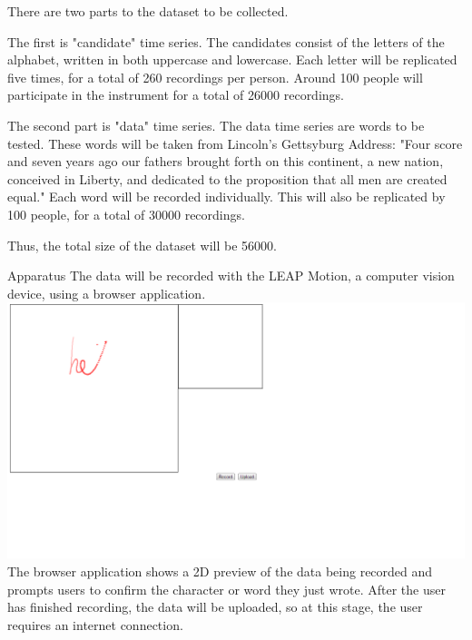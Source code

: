 There are two parts to the dataset to be collected.

The first is "candidate" time series. The candidates consist of the letters of the alphabet, written in both uppercase and lowercase. Each letter will be replicated five times, for a total of 260 recordings per person. Around 100 people will participate in the instrument for a total of 26000 recordings.

The second part is "data" time series. The data time series are words to be tested. These words will be taken from Lincoln's Gettsyburg Address: "Four score and seven years ago our fathers brought forth on this continent, a new nation, conceived in Liberty, and dedicated to the proposition that all men are created equal." Each word will be recorded individually. This will also be replicated by 100 people, for a total of 30000 recordings.

Thus, the total size of the dataset will be 56000.

Apparatus
The data will be recorded with the LEAP Motion, a computer vision device, using a browser application. 
\includegraphics[width=\columnwidth]{images/recording-1.PNG}
The browser application shows a 2D preview of the data being recorded and prompts users to confirm the character or word they just wrote.
After the user has finished recording, the data will be uploaded, so at this stage, the user requires an internet connection.
